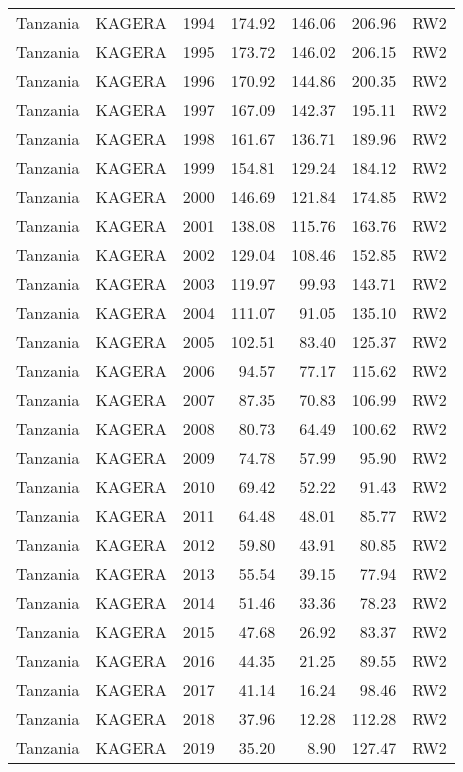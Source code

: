 \begin{longtable}{lllrrrl}
  Tanzania & KAGERA & 1994 & 174.92 & 146.06 & 206.96 & RW2 \\ 
  Tanzania & KAGERA & 1995 & 173.72 & 146.02 & 206.15 & RW2 \\ 
  Tanzania & KAGERA & 1996 & 170.92 & 144.86 & 200.35 & RW2 \\ 
  Tanzania & KAGERA & 1997 & 167.09 & 142.37 & 195.11 & RW2 \\ 
  Tanzania & KAGERA & 1998 & 161.67 & 136.71 & 189.96 & RW2 \\ 
  Tanzania & KAGERA & 1999 & 154.81 & 129.24 & 184.12 & RW2 \\ 
  Tanzania & KAGERA & 2000 & 146.69 & 121.84 & 174.85 & RW2 \\ 
  Tanzania & KAGERA & 2001 & 138.08 & 115.76 & 163.76 & RW2 \\ 
  Tanzania & KAGERA & 2002 & 129.04 & 108.46 & 152.85 & RW2 \\ 
  Tanzania & KAGERA & 2003 & 119.97 & 99.93 & 143.71 & RW2 \\ 
  Tanzania & KAGERA & 2004 & 111.07 & 91.05 & 135.10 & RW2 \\ 
  Tanzania & KAGERA & 2005 & 102.51 & 83.40 & 125.37 & RW2 \\ 
  Tanzania & KAGERA & 2006 & 94.57 & 77.17 & 115.62 & RW2 \\ 
  Tanzania & KAGERA & 2007 & 87.35 & 70.83 & 106.99 & RW2 \\ 
  Tanzania & KAGERA & 2008 & 80.73 & 64.49 & 100.62 & RW2 \\ 
  Tanzania & KAGERA & 2009 & 74.78 & 57.99 & 95.90 & RW2 \\ 
  Tanzania & KAGERA & 2010 & 69.42 & 52.22 & 91.43 & RW2 \\ 
  Tanzania & KAGERA & 2011 & 64.48 & 48.01 & 85.77 & RW2 \\ 
  Tanzania & KAGERA & 2012 & 59.80 & 43.91 & 80.85 & RW2 \\ 
  Tanzania & KAGERA & 2013 & 55.54 & 39.15 & 77.94 & RW2 \\ 
  Tanzania & KAGERA & 2014 & 51.46 & 33.36 & 78.23 & RW2 \\ 
  Tanzania & KAGERA & 2015 & 47.68 & 26.92 & 83.37 & RW2 \\ 
  Tanzania & KAGERA & 2016 & 44.35 & 21.25 & 89.55 & RW2 \\ 
  Tanzania & KAGERA & 2017 & 41.14 & 16.24 & 98.46 & RW2 \\ 
  Tanzania & KAGERA & 2018 & 37.96 & 12.28 & 112.28 & RW2 \\ 
  Tanzania & KAGERA & 2019 & 35.20 & 8.90 & 127.47 & RW2 \\ 

\end{longtable}
